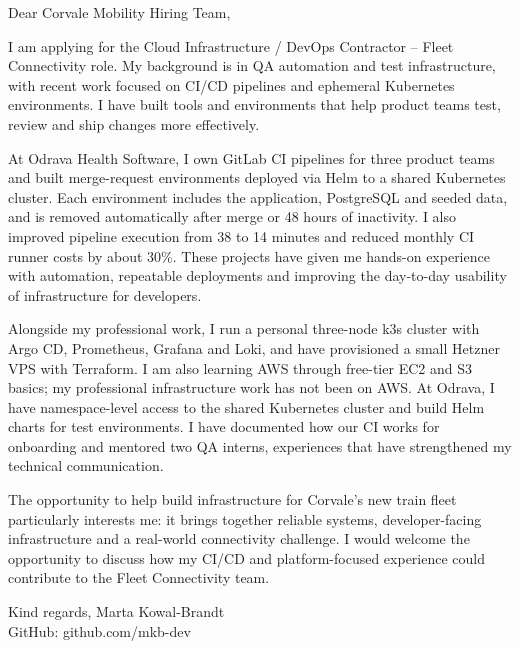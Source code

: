 \documentclass[11pt,a4paper]{article}
\begin{document}
Dear Corvale Mobility Hiring Team,

I am applying for the Cloud Infrastructure / DevOps Contractor – Fleet Connectivity role. My background is in QA automation and test infrastructure, with recent work focused on CI/CD pipelines and ephemeral Kubernetes environments. I have built tools and environments that help product teams test, review and ship changes more effectively.

At Odrava Health Software, I own GitLab CI pipelines for three product teams and built merge-request environments deployed via Helm to a shared Kubernetes cluster. Each environment includes the application, PostgreSQL and seeded data, and is removed automatically after merge or 48 hours of inactivity. I also improved pipeline execution from 38 to 14 minutes and reduced monthly CI runner costs by about 30\%. These projects have given me hands-on experience with automation, repeatable deployments and improving the day-to-day usability of infrastructure for developers.

Alongside my professional work, I run a personal three-node k3s cluster with Argo CD, Prometheus, Grafana and Loki, and have provisioned a small Hetzner VPS with Terraform. I am also learning AWS through free-tier EC2 and S3 basics; my professional infrastructure work has not been on AWS. At Odrava, I have namespace-level access to the shared Kubernetes cluster and build Helm charts for test environments. I have documented how our CI works for onboarding and mentored two QA interns, experiences that have strengthened my technical communication.

The opportunity to help build infrastructure for Corvale’s new train fleet particularly interests me: it brings together reliable systems, developer-facing infrastructure and a real-world connectivity challenge. I would welcome the opportunity to discuss how my CI/CD and platform-focused experience could contribute to the Fleet Connectivity team.

Kind regards,
Marta Kowal-Brandt\\
GitHub: github.com/mkb-dev
\end{document}

